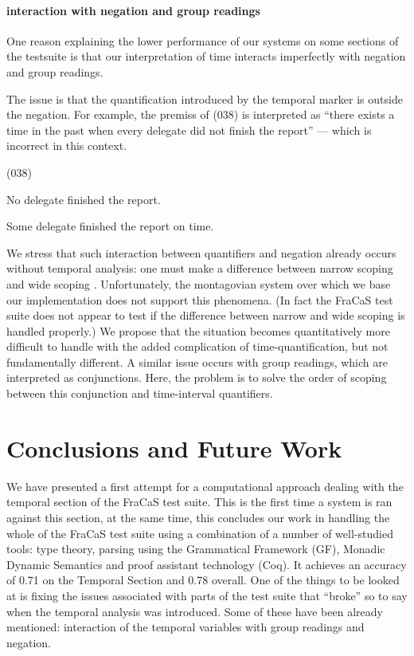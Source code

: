 \documentclass[a4paper,11pt]{article}
\newcommand\hyp{\item[H]}
\newcommand\fracasex[2]{\begin{lingex}\item[(#1)] \begin{subex} #2 \end{subex} \end{lingex} }
\begin{document}
\paragraph{interaction with negation and group readings}
One reason explaining the lower performance of our systems on some
sections of the testsuite is that our interpretation of time interacts
imperfectly with negation and group readings.

The issue is that the quantification introduced by the temporal marker
is outside the negation. For example, the premiss of (038) is
interpreted as ``there exists a time in the past when every delegate
did not finish the report'' --- which is incorrect in this context.
\fracasex{038}{
\item	No delegate finished the report.
\hyp 	Some delegate finished the report on time.
}
%
We stress that such interaction between quantifiers and negation
already occurs without temporal analysis: one must make a difference
between narrow scoping and wide scoping \cite{todo}. Unfortunately,
the montagovian system over which we base our implementation does not
support this phenomena. (In fact the FraCaS test suite does not appear to
test if the difference between narrow and wide scoping is handled properly.)
We propose that the situation becomes
quantitatively more difficult to handle with the added complication of
time-quantification, but not fundamentally different.
%
A similar issue occurs with group readings, which are interpreted as
conjunctions. Here, the problem is to solve the order of scoping
between this conjunction and time-interval quantifiers.

\section{Conclusions and Future Work}
We have presented a first attempt for a computational approach dealing
with the temporal section of the FraCaS test suite. This is the first
time a system is ran against this section, at the same time, this
concludes our work in handling the whole of the FraCaS test suite
using a combination of a number of well-studied tools: type theory,
parsing using the Grammatical Framework (GF), Monadic Dynamic
Semantics and proof assistant technology (Coq). It achieves an
accuracy of 0.71 on the Temporal Section and 0.78 overall. One of the
things to be looked at is fixing the issues associated with parts of
the test suite that ``broke'' so to say when the temporal analysis was
introduced. Some of these have been already mentioned: interaction of
the temporal variables with group readings and negation.
\end{document}
